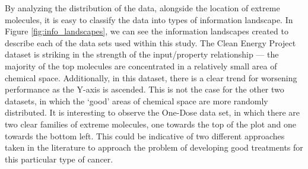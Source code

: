 By
analyzing the distribution of the data, alongside the location of extreme
molecules, it is easy to classify the data into types of information landscape.
In Figure \ref{fig:info_landscapes}, we can see the information landscapes
created to describe each of the data sets used within this study.  The Clean
Energy Project dataset is striking in the strength of the input/property
relationship --- the majority of the top molecules are concentrated in a
relatively small area of chemical space.  Additionally, in this dataset, there
is a clear trend for worsening performance as the Y-axis is ascended.  This is
not the case for the other two datasets, in which the `good' areas of chemical
space are more randomly distributed.  It is interesting to observe the One-Dose
data set, in which there are two clear families of extreme molecules, one
towards the top of the plot and one towards the bottom left.  This could be
indicative of two different approaches taken in the literature to approach the
problem of developing good treatments for this particular type of cancer.

